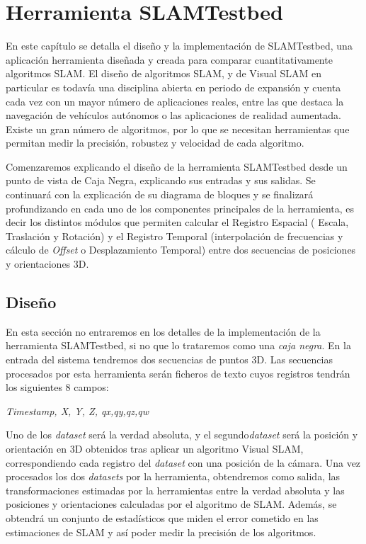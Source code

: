 \newpage
\chapter{Herramienta SLAMTestbed} \label{cap:Herramienta SLAMTestbed} %
En este capítulo se detalla el diseño y la implementación de SLAMTestbed, una aplicación herramienta diseñada y creada para comparar cuantitativamente algoritmos SLAM. El diseño de algoritmos SLAM, y de Visual SLAM en particular es todavía una disciplina abierta en periodo de expansión y cuenta cada vez con un mayor número de aplicaciones reales, entre las que destaca la navegación de vehículos autónomos o las aplicaciones de realidad aumentada. Existe un gran número de algoritmos, por lo que se necesitan herramientas que  permitan medir la precisión, robustez y velocidad de cada algoritmo.

Comenzaremos explicando el diseño de la herramienta SLAMTestbed desde un punto de vista de Caja Negra, explicando sus entradas y sus salidas. Se continuará con la explicación de su diagrama de bloques y se finalizará profundizando en cada uno de los componentes principales de la herramienta, es decir los distintos módulos que permiten calcular el Registro Espacial ( Escala, Traslación y Rotación) y el Registro Temporal (interpolación de frecuencias y cálculo de \textit{Offset} o Desplazamiento Temporal) entre dos secuencias de posiciones y orientaciones 3D.

\section{Diseño}

En esta sección no entraremos en los detalles de la implementación de la herramienta SLAMTestbed, si no que lo trataremos como una \textit{caja negra}.
En la entrada del sistema tendremos dos secuencias de puntos 3D.
Las secuencias procesados por esta herramienta serán ficheros de texto cuyos registros tendrán los siguientes 8 campos:

\textit{Timestamp, X, Y, Z, qx,qy,qz,qw}

Uno de los \textit{dataset} será la verdad absoluta, y el segundo\textit{dataset} será la posición y orientación en 3D obtenidos tras aplicar un algoritmo Visual SLAM, correspondiendo cada registro del \textit{dataset} con una posición de la cámara.
Una vez procesados los dos \textit{datasets} por la herramienta, obtendremos como salida, las transformaciones estimadas por la herramientas entre la verdad absoluta y las posiciones y orientaciones calculadas por el algoritmo de SLAM. Además, se obtendrá un conjunto de estadísticos que miden el error cometido en las estimaciones de SLAM y así poder medir la precisión de los algoritmos.


